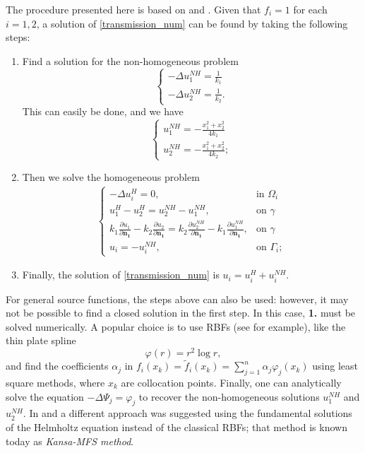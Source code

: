 The procedure presented here is based on \cite{alves2005new} and \cite{alves2021domain}. Given that \(f_i = 1\) for each \(i=1, 2\), a solution of \eqref{transmission_num} can be found by taking the following steps:
\begin{enumerate}
    \item Find a solution for the non-homogeneous problem
    \[
        \begin{cases}
            -\Delta u_1^{NH} = \frac{1}{k_1}\\
            -\Delta u_2^{NH} = \frac{1}{k_2}.
        \end{cases}
    \]
    This can easily be done, and we have
    \[
        \begin{cases}
            u_1^{NH} = -\frac{x_1^2 + x_2^2}{4k_1}\\
            u_2^{NH} = -\frac{x_1^2 + x_2^2}{4k_2};
        \end{cases}
    \]
    \item Then we solve the homogeneous problem
    \begin{align}\label{transmission_num_homo}
        \begin{cases}
        - \Delta u_i^H = 0, & \text{in }\Omega_i\\
        u_1^H - u_2^H = u_2^{NH}- u_1^{NH}, & \text{on }\gamma\\
        k_1 \frac{\partial u_1}{\partial \mathbf{n_1}} - k_2 \frac{\partial u_2}{\partial  \mathbf{n_1}} = k_2 \frac{\partial u_2^{NH}}{\partial  \mathbf{n_1}}  - k_1 \frac{\partial u_1^{NH}}{\partial  \mathbf{n_1}}, & \text{on }\gamma\\
        u_i = - u_i^{NH}, & \text{on }\Gamma_i;
        \end{cases}
    \end{align}
    \item Finally, the solution of \eqref{transmission_num} is \(u_i = u_i^H + u_i^{NH}\).
\end{enumerate}
For general source functions, the steps above can also be used: however, it may not be possible to find a closed solution in the first step. In this case, \textbf{1.} must be solved numerically. A popular choice is to use \acp{RBF} (see \cite{golberg1996improved} for example), like the thin plate spline
\[
    \varphi(r) = r^2 \log r,     
\]
and find the coefficients \(\alpha_j\) in \(f_i(x_k) = \tilde{f}_i(x_k) = \sum_{j=1}^{n} \alpha_j \varphi_j(x_k)\) using least square methods, where \(x_k\) are collocation points. Finally, one can analytically solve the equation \(-\Delta \Psi_j = \varphi_j\) to recover the non-homogeneous solutions \(u_1^{NH}\) and \(u_2^{NH}\). In \cite{alves2005new} and \cite{alves2021domain} a different approach was suggested using the fundamental solutions of the Helmholtz equation instead of the classical \acp{RBF}; that method is known today as \textit{Kansa-MFS method}.

